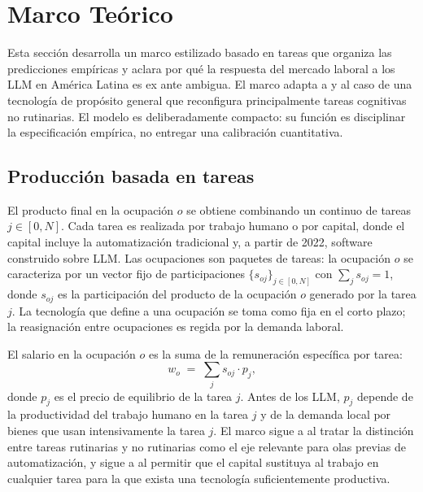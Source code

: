 \section{Marco Teórico}
\label{sec:theory}

Esta sección desarrolla un marco estilizado basado en tareas que organiza las predicciones empíricas y aclara por qué la respuesta del mercado laboral a los LLM en América Latina es ex ante ambigua. El marco adapta a \citet{AcemogluAutor2011_tasks} y \citet{AcemogluRestrepo2018_race, AcemogluRestrepo2022_tasks_inequality} al caso de una tecnología de propósito general que reconfigura principalmente tareas cognitivas no rutinarias. El modelo es deliberadamente compacto: su función es disciplinar la especificación empírica, no entregar una calibración cuantitativa.

\subsection{Producción basada en tareas}
\label{subsec:theory_tasks}

El producto final en la ocupación $o$ se obtiene combinando un continuo de tareas $j \in [0, N]$. Cada tarea es realizada por trabajo humano o por capital, donde el capital incluye la automatización tradicional y, a partir de 2022, software construido sobre LLM. Las ocupaciones son paquetes de tareas: la ocupación $o$ se caracteriza por un vector fijo de participaciones $\{s_{oj}\}_{j \in [0,N]}$ con $\sum_j s_{oj} = 1$, donde $s_{oj}$ es la participación del producto de la ocupación $o$ generado por la tarea $j$. La tecnología que define a una ocupación se toma como fija en el corto plazo; la reasignación entre ocupaciones es regida por la demanda laboral.

El salario en la ocupación $o$ es la suma de la remuneración específica por tarea:
\begin{equation}
w_o \;=\; \sum_j s_{oj} \cdot p_j,
\label{eq:wage_basic}
\end{equation}
donde $p_j$ es el precio de equilibrio de la tarea $j$. Antes de los LLM, $p_j$ depende de la productividad del trabajo humano en la tarea $j$ y de la demanda local por bienes que usan intensivamente la tarea $j$. El marco sigue a \citet{AutorLM2003_skill_content} al tratar la distinción entre tareas rutinarias y no rutinarias como el eje relevante para olas previas de automatización, y sigue a \citet{AcemogluAutor2011_tasks} al permitir que el capital sustituya al trabajo en cualquier tarea para la que exista una tecnología suficientemente productiva.

